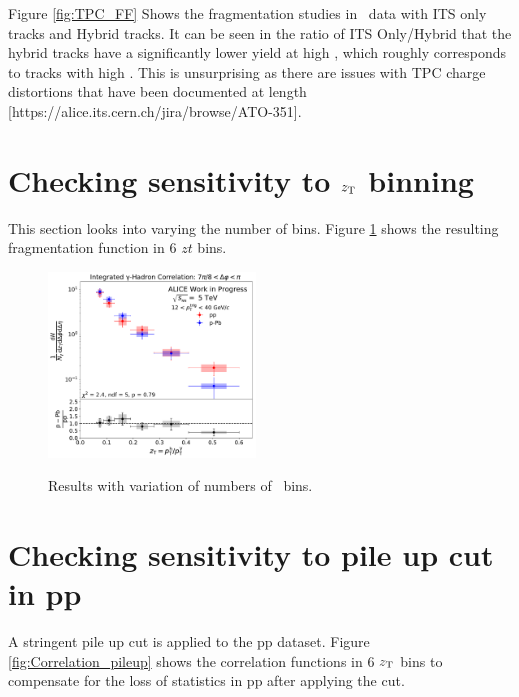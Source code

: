 Figure \ref{fig:TPC_FF} Shows the fragmentation studies in \pPb~data with ITS only tracks and Hybrid tracks. It can be seen in the ratio of ITS Only/Hybrid that the hybrid tracks have a significantly lower yield at high \zt, which roughly corresponds to tracks with high \pt. This is unsurprising as there are issues with TPC charge distortions that have been documented at length [https://alice.its.cern.ch/jira/browse/ATO-351].

\section{Checking sensitivity to $z_{\mathrm{T}}$ binning}
This section looks into varying the number of \zt bins. Figure \ref{fig:FF_zT_Rebin} shows the resulting fragmentation function in 6 $zt$ bins. 


\begin{figure}
\centering
\includegraphics[width=0.49\textwidth]{G-H_New/zT_Rebin_6_006zT06zTITSSub/Final_FFunction_and_Ratio.pdf}
\label{fig:FF_zT_Rebin}
\caption{Results with variation of numbers of \zt~bins. }
\end{figure}



\section{Checking sensitivity to pile up cut in pp}
A stringent pile up cut is applied to the pp dataset. Figure \ref{fig:Correlation_pileup} shows the correlation functions in 6 $z_{\mathrm{T}}$ bins to compensate for the loss of statistics in pp after applying the cut.

